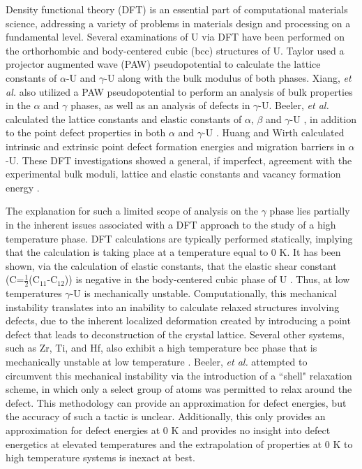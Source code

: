 \documentclass[review]{elsarticle}
\begin{document}
Density functional theory (DFT) is an essential part of computational materials science, addressing a variety of problems in materials design and processing on a fundamental level. Several examinations of U via DFT have been performed on the orthorhombic and body-centered cubic (bcc) structures of U. Taylor \cite{taylor2008} used a projector augmented wave (PAW) pseudopotential to calculate the lattice constants of $\alpha$-U and $\gamma$-U along with the bulk modulus of both phases. Xiang, \textit{et al.} \cite{xiang2008} also utilized a PAW pseudopotential to perform an analysis of bulk properties in the $\alpha$ and $\gamma$ phases, as well as an analysis of defects in $\gamma$-U.  Beeler, \textit{et al.} calculated the lattice constants and elastic constants of $\alpha$, $\beta$ and $\gamma$-U \cite{beeler2013}, in addition to the point defect properties in both $\alpha$ and $\gamma$-U \cite{beeler2010}. Huang and Wirth \cite{wirth2011, wirth2012} calculated intrinsic and extrinsic point defect formation energies and migration barriers in $\alpha$-U. These DFT investigations showed a general, if imperfect, agreement with the experimental bulk moduli, lattice and elastic constants and vacancy formation energy \cite{yoo1998, barrett1963, matter1980}. 

The explanation for such a limited scope of analysis on the $\gamma$ phase lies partially in the inherent issues associated with a DFT approach to the study of a high temperature phase. DFT calculations are typically performed statically, implying that the calculation is taking place at a temperature equal to 0 K. It has been shown, via the calculation of elastic constants, that the elastic shear constant (C\textprime=$\frac{1}{2}$(C$_{11}$-C$_{12}$)) is negative in the body-centered cubic phase of U \cite{soderlind1998, beeler2013}. Thus, at low temperatures $\gamma$-U is mechanically unstable. Computationally, this mechanical instability translates into an inability to calculate relaxed structures involving defects, due to the inherent localized deformation created by introducing a point defect that leads to deconstruction of the crystal lattice. Several other systems, such as Zr, Ti, and Hf, also exhibit a high temperature bcc phase that is mechanically unstable at low temperature \cite{sanchez1975, ye1987}. Beeler, \textit{et al.} \cite{beeler2010} attempted to circumvent this mechanical instability via the introduction of a ``shell" relaxation scheme, in which only a select group of atoms was permitted to relax around the defect. This methodology can provide an approximation for defect energies, but the accuracy of such a tactic is unclear. Additionally, this only provides an approximation for defect energies at 0 K and provides no insight into defect energetics at elevated temperatures and the extrapolation of properties at 0 K to high temperature systems is inexact at best.  
\end{document}
